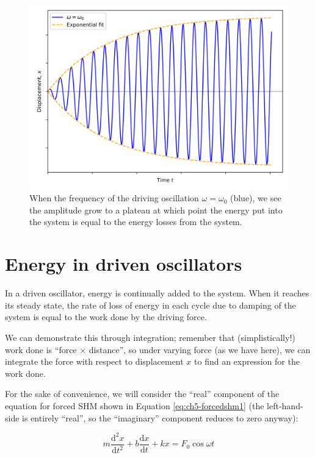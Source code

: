 \documentclass[
]{book}
\begin{document}
\begin{figure}

{\centering \includegraphics[width=0.7\linewidth]{visualisations/ch5-forcedosc5} 

}

\caption{When the frequency of the driving oscillation $\omega = \omega_0$ (blue), we see the amplitude grow to a plateau at which point the energy put into the system is equal to the energy losses from the system.}\label{fig:ch5-resonancedisplacement1}
\end{figure}

\hypertarget{sec:ch5-energydrivenoscillators}{%
\section{Energy in driven oscillators}\label{sec:ch5-energydrivenoscillators}}

In a driven oscillator, energy is continually added to the system. When it reaches its steady state, the rate of loss of energy in each cycle due to damping of the system is equal to the work done by the driving force.

We can demonstrate this through integration; remember that (simplistically!) work done is ``force \(\times\) distance'', so under varying force (as we have here), we can integrate the force with respect to displacement \(x\) to find an expression for the work done.

For the sake of convenience, we will consider the ``real'' component of the equation for forced SHM shown in Equation \eqref{eq:ch5-forcedshm1} (the left-hand-side is entirely ``real'', so the ``imaginary'' component reduces to zero anyway):

\begin{equation}
m \frac{\mathrm{d}^2 x}{\mathrm{d}t^2} + b \frac{\mathrm{d}x}{\mathrm{d}t}+ kx = F_0 \cos \omega t
\label{eq:ch5-oscillatorenergy1}
\end{equation}
\end{document}
